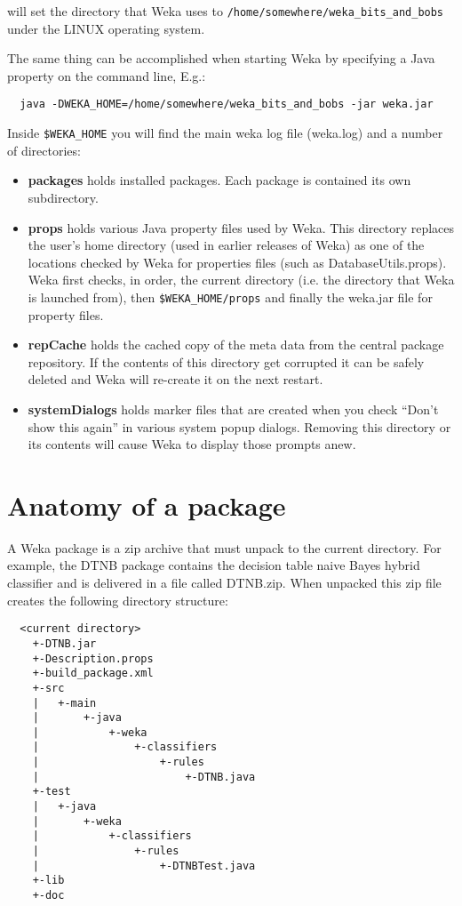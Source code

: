 will set the directory that Weka uses to
\verb=/home/somewhere/weka_bits_and_bobs= under the
LINUX operating system.

The same thing can be accomplished when starting Weka by
specifying a Java property on the command line, E.g.:

{\scriptsize
\begin{verbatim}
  java -DWEKA_HOME=/home/somewhere/weka_bits_and_bobs -jar weka.jar
\end{verbatim}}

Inside \verb=$WEKA_HOME= you will find the main weka log file (weka.log)
and a number of directories:

\begin{itemize}
\item \textbf{packages} holds installed packages. Each package is
  contained its own subdirectory.
\item \textbf{props} holds various Java property files used by
  Weka. This directory replaces the user's home directory (used in
  earlier releases of Weka) as one of the locations checked by Weka
  for properties files (such as DatabaseUtils.props). Weka first
  checks, in order, the current directory (i.e. the directory that
  Weka is launched from), then \verb=$WEKA_HOME/props= and finally the
  weka.jar file for property files.
\item \textbf{repCache} holds the cached copy of the meta data from
  the central package repository. If the contents of this directory
  get corrupted it can be safely deleted and Weka will re-create it on
  the next restart.
\item \textbf{systemDialogs} holds marker files that are created when
  you check ``Don't show this again'' in various system popup
  dialogs. Removing this directory or its contents will cause Weka to
  display those prompts anew.
\end{itemize}

\section{Anatomy of a package}

A Weka package is a zip archive that must unpack to the current
directory. For example, the DTNB package contains the decision table
naive Bayes hybrid classifier and is delivered in a file called
DTNB.zip. When unpacked this zip file creates the following directory
structure:

{\scriptsize
\begin{verbatim}
  <current directory>
    +-DTNB.jar
    +-Description.props
    +-build_package.xml
    +-src
    |   +-main
    |       +-java
    |           +-weka
    |               +-classifiers
    |                   +-rules
    |                       +-DTNB.java
    +-test
    |   +-java
    |       +-weka
    |           +-classifiers
    |               +-rules
    |                   +-DTNBTest.java
    +-lib
    +-doc
\end{verbatim}}

